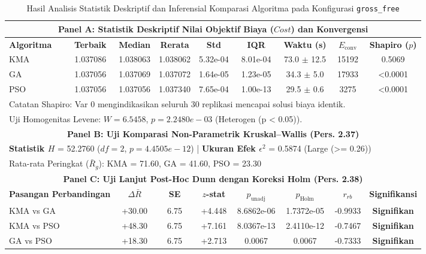 \begin{table}[htbp]
\centering
\caption{Hasil Analisis Statistik Deskriptif dan Inferensial Komparasi Algoritma pada Konfigurasi \texttt{gross_free}}
\label{tab:stats_gross_free}
\small
\begin{tabular}{lcccccccc}
\toprule
\multicolumn{9}{c}{\textbf{Panel A: Statistik Deskriptif Nilai Objektif Biaya ($Cost$) dan Konvergensi}} \\
\midrule
\textbf{Algoritma} & \textbf{Terbaik} & \textbf{Median} & \textbf{Rerata} & \textbf{Std} & \textbf{IQR} & \textbf{Waktu (s)} & \textbf{$E_{\text{conv}}$} & \textbf{Shapiro ($p$)} \\
\midrule
KMA & 1.037086 & 1.038063 & 1.038062 & 5.32e-04 & 8.01e-04 & 73.0 $\pm$ 12.5 & 15192 & 0.5069 \\
GA & 1.037056 & 1.037069 & 1.037072 & 1.64e-05 & 1.23e-05 & 34.3 $\pm$ 5.0 & 17933 & <0.0001 \\
PSO & 1.037056 & 1.037056 & 1.037340 & 7.65e-04 & 1.00e-13 & 29.5 $\pm$ 0.6 & 3275 & <0.0001 \\
\midrule
\multicolumn{9}{l}{\footnotesize *Catatan Shapiro: Var 0 mengindikasikan seluruh 30 replikasi mencapai solusi biaya identik.} \\
\multicolumn{9}{l}{\footnotesize Uji Homogenitas Levene: $W = 6.5458$, $p = 2.2480e-03$ (Heterogen (p < 0.05)).} \\
\midrule
\multicolumn{9}{c}{\textbf{Panel B: Uji Komparasi Non-Parametrik Kruskal--Wallis (Pers. 2.37)}} \\
\midrule
\multicolumn{9}{l}{\textbf{Statistik $H$} = 52.2760 \quad ($df = 2$, $p = 4.4505e-12$) \quad | \quad \textbf{Ukuran Efek $\epsilon^2$} = 0.5874 (Large (>= 0.26))} \\
\multicolumn{9}{l}{\footnotesize Rata-rata Peringkat ($\bar{R}_g$): KMA = 71.60, GA = 41.60, PSO = 23.30} \\
\midrule
\multicolumn{9}{c}{\textbf{Panel C: Uji Lanjut Post-Hoc Dunn dengan Koreksi Holm (Pers. 2.38)}} \\
\midrule
\multicolumn{2}{l}{\textbf{Pasangan Perbandingan}} & \textbf{$\Delta \bar{R}$} & \textbf{SE} & \textbf{$z$-stat} & \textbf{$p_{\text{unadj}}$} & \textbf{$p_{\text{Holm}}$} & \textbf{$r_{rb}$} & \textbf{Signifikansi} \\
\midrule
\multicolumn{2}{l}{KMA vs GA} & +30.00 & 6.75 & +4.448 & 8.6862e-06 & 1.7372e-05 & -0.9933 & \textbf{Signifikan} \\
\multicolumn{2}{l}{KMA vs PSO} & +48.30 & 6.75 & +7.161 & 8.0367e-13 & 2.4110e-12 & -0.7467 & \textbf{Signifikan} \\
\multicolumn{2}{l}{GA vs PSO} & +18.30 & 6.75 & +2.713 & 0.0067 & 0.0067 & -0.7333 & \textbf{Signifikan} \\
\bottomrule
\end{tabular}
\end{table}